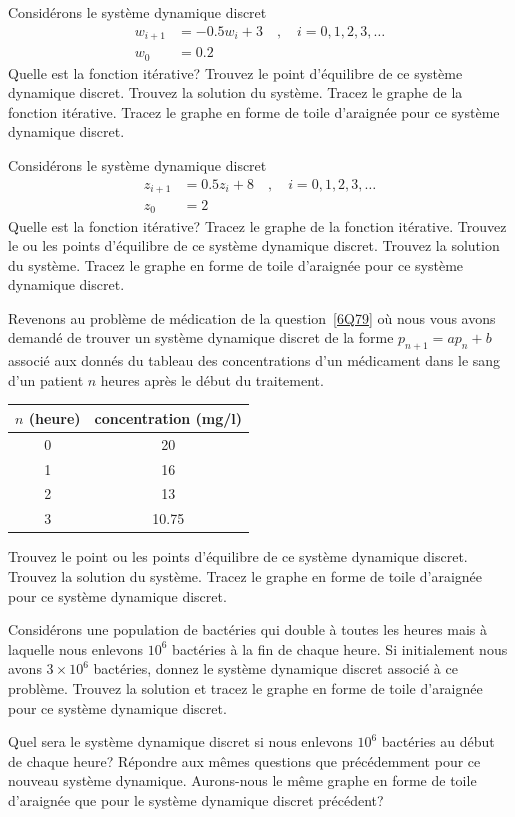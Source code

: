 \begin{question}[\life]
Considérons le système dynamique discret
\begin{align*}
w_{i+1} &= -0.5 w_i + 3 \quad , \quad i=0, 1, 2, 3, \ldots \\
w_0 &= 0.2
\end{align*}
Quelle est la fonction itérative?  Trouvez le point d'équilibre de ce
système dynamique discret.  Trouvez la solution du système.
Tracez le graphe de la fonction itérative.  Tracez le graphe en forme
de toile d'araignée pour ce système dynamique discret.
\label{6Q83}
\end{question}

\begin{question}[\life]
Considérons le système dynamique discret
\begin{align*}
z_{i+1} &= 0.5 z_i + 8  \quad , \quad i=0, 1, 2, 3, \ldots \\
z_0 & = 2
\end{align*}
Quelle est la fonction itérative?  Tracez le graphe de la fonction
itérative.  Trouvez le ou les points d'équilibre de ce système dynamique
discret.  Trouvez la solution du système.  Tracez le graphe en forme
de toile d'araignée pour ce système dynamique discret.
\label{6Q84}
\end{question}

\begin{question}[\life]
Revenons au problème de médication de la question~\ref{6Q79} où
nous vous avons demandé de trouver un système dynamique discret de la forme
$p_{n+1} = a p_n + b$ associé aux donnés du tableau des concentrations
d'un médicament dans le sang d'un patient $n$ heures après le début du
traitement.
\begin{center}
\begin{tabular}{c|c}
$n$ (heure) & concentration (mg/l) \\
\hline
0 & 20 \\
1 & 16 \\
2 & 13 \\
3 & 10.75
\end{tabular}
\end{center}
Trouvez le point ou les points d'équilibre de ce système dynamique
discret. Trouvez la solution du système.  Tracez le graphe en forme de
toile d'araignée pour ce système dynamique discret.
\label{6Q85}
\end{question}

\begin{question}[\life]
Considérons une population de bactéries qui double à toutes les
heures mais à laquelle nous enlevons $10^6$ bactéries à la fin de chaque
heure.  Si initialement nous avons $3\times 10^6$ bactéries, donnez le
système dynamique discret associé à ce problème.  Trouvez la solution
et tracez le graphe en forme de toile d'araignée pour ce
système dynamique discret.

Quel sera le système dynamique discret si nous enlevons $10^6$ bactéries
au début de chaque heure?  Répondre aux mêmes questions que
précédemment pour ce nouveau système dynamique.  Aurons-nous le même
graphe en forme de toile d'araignée que pour le système dynamique
discret précédent?
\label{6Q86}
\end{question}


